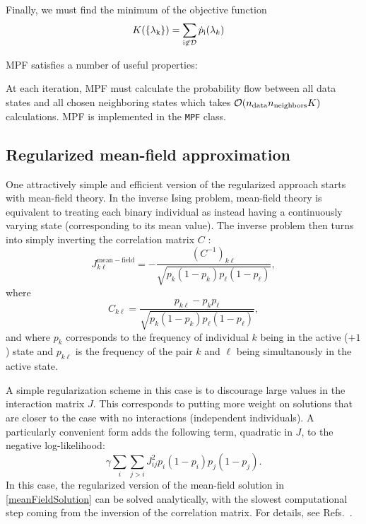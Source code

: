 \documentclass[aps,prl,twocolumn]{revtex4-1}
\begin{document}
Finally, we must find the minimum of the objective function
\begin{align}
	K(\{\lambda_{\rm k}\}) &= \sum_{\rm i \not\in \mathcal{D}} \dot{p}_{\rm i}(\lambda_k)
\end{align}

MPF satisfies a number of useful properties:


At each iteration, MPF must calculate the probability flow between all data states and all chosen neighboring states which takes $\mathcal{O}(n_{\rm data}n_{\rm neighbors}K)$ calculations.
MPF is implemented in the {\tt MPF} class.


\subsection{Regularized mean-field approximation}
One attractively simple and efficient version of the regularized approach starts
with mean-field theory.  In the inverse Ising problem, mean-field theory is equivalent
to treating each binary individual as instead having a continuously varying state
(corresponding to its mean value).  The inverse problem then turns into simply inverting
the correlation matrix $C$ \cite{CocMon12}: 
\begin{equation}
\label{meanFieldSolution}
J^{\mathrm{mean-field}}_{k\ell} =
    - \frac{ (C^{-1})_{k\ell} }{ \sqrt{p_k(1-p_k)p_\ell(1-p_\ell)} },
\end{equation}
where
\begin{equation}
C_{k\ell} = \frac{ p_{k\ell} - p_k p_\ell }{ \sqrt{p_k(1-p_k)p_\ell(1-p_\ell)} },
\end{equation}
and where $p_k$ corresponds to the frequency of individual $k$ being
in the active ($+1$) state and $p_{k\ell}$ is the frequency of the pair
$k$ and $\ell$ being simultanously in the active state.

A simple regularization scheme in this case is to discourage large values in the interaction
matrix $J$.  This corresponds to putting more weight on solutions that are closer to
the case with no interactions (independent individuals).  A particularly convenient form
adds the following term, quadratic in $J$, to the negative log-likelihood:
\begin{equation}
\gamma \sum_i \sum_{j > i} J_{ij}^2 p_i (1-p_i) p_j (1-p_j).
\end{equation}
In this case, the regularized version of the mean-field solution in \eqref{meanFieldSolution}
can be solved analytically, with the slowest computational step coming from the inversion
of the correlation matrix.  For details, see Refs.~\cite{DanKraFla17,BarCoc13}.
\end{document}
